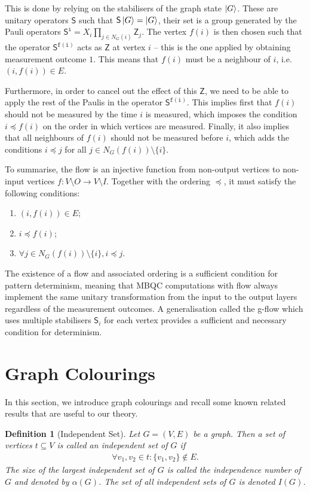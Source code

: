 \documentclass[12pt]{iopart}
\newcommand{\cptp}[1]{\mathsf{#1}} \newcommand{\pd}[1]{\mathcal{#1}}  \newcommand{\sch}[1]{\bm{#1}}
\newcommand{\Z}{\cptp{Z}}
\renewcommand{\1}{\mathds{1}}
\newtheorem{definition}{Definition}
\begin{document}
This is done by relying on the stabilisers of the graph state $\ket{G}$. These are unitary operators $\cptp S$ such that $\cptp S\ket{G} = \ket{G}$, their set is a group generated by the Pauli operators $\cptp S^{\mathtt{i}} = X_i \prod_{j \in N_G(i)} \Z_j$. The vertex $f(i)$ is then chosen such that the operator $\cptp S^{\mathtt{f(i)}}$ acts as $\Z$ at vertex $i$ -- this is the one applied by obtaining measurement outcome $1$. This means that $f(i)$ must be a neighbour of $i$, i.e.~$(i, f(i)) \in E$.

Furthermore, in order to cancel out the effect of this $\Z$, we need to be able to apply the rest of the Paulis in the operator $\cptp S^{\mathtt{f(i)}}$. This implies first that $f(i)$ should not be measured by the time $i$ is measured, which imposes the condition $i \preceq f(i)$ on the order in which vertices are measured. Finally, it also implies that all neighbours of $f(i)$ should not be measured before $i$, which adds the conditions $i \preceq j$ for all $j \in N_G(f(i)) \setminus \{i\}$.

To summarise, the flow is an injective function from non-output vertices to non-input vertices $f : V \setminus O \rightarrow V \setminus I$.  Together with the ordering $\preceq$, it must satisfy the following conditions:
\begin{enumerate}
\item $(i, f(i)) \in E$;
\item $i \preceq f(i)$;
\item $\forall j \in N_G(f(i)) \setminus \{i\}, i \preceq j$.
\end{enumerate}

The existence of a flow and associated ordering is a sufficient condition for pattern determinism, meaning that MBQC computations with flow always implement the same unitary transformation from the input to the output layers regardless of the measurement outcomes. A generalisation called the g-flow which uses multiple stabilisers $\cptp S_i$ for each vertex provides a sufficient and necessary condition for determinism. 
\section{Graph Colourings}
\label{sec:graph_colourings}
In this section, we introduce graph colourings and recall some known related results that are useful to our theory.

\begin{definition}[Independent Set]\label{def:indep_set}
  Let $G=(V,E)$ be a graph. Then a set of vertices $t \subseteq V$ is called an \emph{independent set} of $G$ if
  \begin{align}
    \forall v_1, v_2 \in t: \{v_1, v_2 \} \not\in E.
  \end{align}
  The size of the largest independent set of $G$ is called the \emph{independence number} of $G$ and denoted by $\alpha(G)$. The set of all independent sets of $G$ is denoted $I(G)$.
\end{definition}
\end{document}
